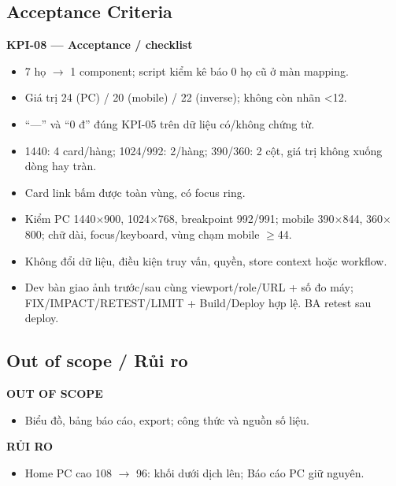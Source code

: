 \documentclass[11pt,a4paper]{report}
\begin{document}
\subsection*{Acceptance Criteria}
\par\smallskip\textbf{KPI-08 — Acceptance / checklist}\par
\begin{itemize}[label=$\square$]
\item 7 họ \(\to\) 1 component; script kiểm kê báo 0 họ cũ ở màn mapping.
\item Giá trị 24 (PC) / 20 (mobile) / 22 (inverse); không còn nhãn \textless{}12.
\item “—” và “0 đ” đúng KPI-05 trên dữ liệu có/\allowbreak{}không chứng từ.
\item 1440: 4 card/\allowbreak{}hàng; 1024/\allowbreak{}992: 2/\allowbreak{}hàng; 390/\allowbreak{}360: 2 cột, giá trị không xuống dòng hay tràn.
\item Card link bấm được toàn vùng, có focus ring.
\item Kiểm PC 1440\(\times\)900, 1024\(\times\)768, breakpoint 992/\allowbreak{}991; mobile 390\(\times\)844, 360\(\times\)800; chữ dài, focus/\allowbreak{}keyboard, vùng chạm mobile \(\geq\)44.
\item Không đổi dữ liệu, điều kiện truy vấn, quyền, store context hoặc workflow.
\item Dev bàn giao ảnh trước/\allowbreak{}sau cùng viewport/\allowbreak{}role/\allowbreak{}URL + số đo máy; FIX/\allowbreak{}IMPACT/\allowbreak{}RETEST/\allowbreak{}LIMIT + Build/\allowbreak{}Deploy hợp lệ. BA retest sau deploy.
\end{itemize}
\subsection*{Out of scope / Rủi ro}
\par\smallskip\textbf{OUT OF SCOPE}\par
\begin{itemize}
\item Biểu đồ, bảng báo cáo, export; công thức và nguồn số liệu.
\end{itemize}

\par\smallskip\textbf{RỦI RO}\par
\begin{itemize}
\item Home PC cao 108 \(\to\) 96: khối dưới dịch lên; Báo cáo PC giữ nguyên.
\end{itemize}
\end{document}
